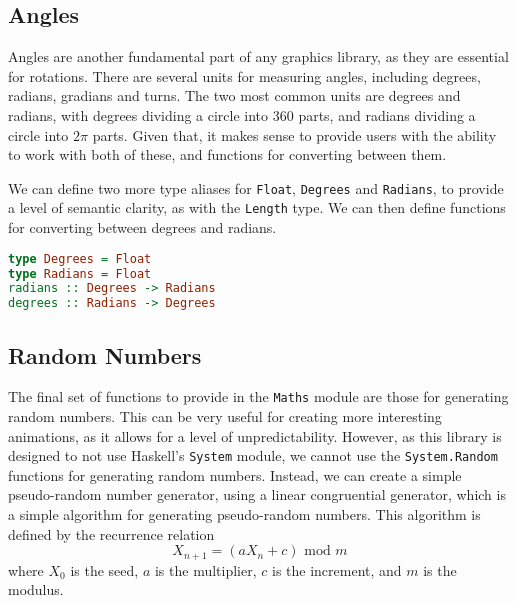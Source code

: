 \documentclass[../main.tex]{subfiles}
\begin{document}
        \subsection{Angles}
            Angles are another fundamental part of any graphics library, as they are
                essential for rotations.
            There are several units for measuring angles, including degrees, radians,
                gradians and turns.
            The two most common units are degrees and radians, with degrees dividing a
                circle into 360 parts, and radians dividing a circle into $2\pi$ parts.
            Given that, it makes sense to provide users with the ability to work with both
                of these, and functions for converting between them.

            We can define two more type aliases for \verb|Float|, \verb|Degrees| and
                \verb|Radians|, to provide a level of semantic clarity, as with the
                \verb|Length| type.
            We can then define functions for converting between degrees and radians.

            \begin{lstlisting}[language=Haskell, label={lst:angleFns}, morekeywords={Degrees, Radians}, caption={The angle functions.}]  
type Degrees = Float
type Radians = Float                
radians :: Degrees -> Radians
degrees :: Radians -> Degrees\end{lstlisting}

        \subsection{Random Numbers}
            The final set of functions to provide in the \verb|Maths| module are those for
                generating random numbers.
            This can be very useful for creating more interesting animations, as it allows
                for a level of unpredictability.
            However, as this library is designed to not use Haskell's \verb|System| module,
                we cannot use the \verb|System.Random| functions for generating random numbers.
            Instead, we can create a simple pseudo-random number generator, using a linear
                congruential generator, which is a simple algorithm for generating
                pseudo-random numbers.
            This algorithm is defined by the recurrence relation $$X_{n+1} = (aX_n + c)
                    \text{ mod } m$$ where $X_0$ is the seed, $a$ is the multiplier, $c$ is the
                increment, and $m$ is the modulus.
\end{document}
